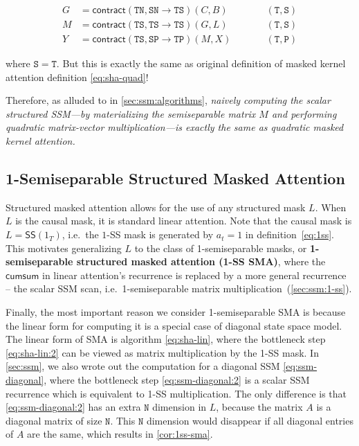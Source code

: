 \begin{equation}
  \label{eq:ssm-quad}
  \begin{aligned}
    G     & = \mathsf{contract}(\mathtt{TN, SN \to TS})(C, B) & & \qquad \mathtt{(T,S)} \\
    M     & = \mathsf{contract}(\mathtt{TS, TS \to TS})(G, L) & & \qquad \mathtt{(T,S)} \\
    Y     & = \mathsf{contract}(\mathtt{TS, SP \to TP})(M, X) & & \qquad \mathtt{(T,P)}
  \end{aligned}
\end{equation}

where $\mathtt{S}=\mathtt{T}$.
But this is exactly the same as original definition of masked kernel attention definition \eqref{eq:sha-quad}!

Therefore, as alluded to in \ref{sec:ssm:algorithms},
\emph{naively computing the scalar structured SSM---by materializing the semiseparable matrix $M$ and performing quadratic matrix-vector multiplication---is exactly the same as quadratic masked kernel attention.}

\subsection{1-Semiseparable Structured Masked Attention}
\label{sec:ssd:1ss-sma}

Structured masked attention allows for the use of any structured mask $L$. When $L$ is the causal mask, it is standard linear attention. Note that the causal mask is $L = \mathsf{SS}(1_T)$, i.e.\ the $1$-SS mask is generated by $a_t=1$ in definition~\eqref{eq:1ss}.
This motivates generalizing $L$ to the class of 1-semiseparable masks, or \textbf{1-semiseparable structured masked attention (1-SS SMA)}, where the $\mathsf{cumsum}$ in linear attention's recurrence is replaced by a more general recurrence -- the scalar SSM scan, i.e.\ 1-semiseparable matrix multiplication~(\ref{sec:ssm:1-ss}).

Finally, the most important reason we consider 1-semiseparable SMA is because the linear form for computing it is a special case of diagonal state space model. The linear form of SMA is algorithm \eqref{eq:sha-lin}, where the bottleneck step \eqref{eq:sha-lin:2} can be viewed as matrix multiplication by the 1-SS mask. In \ref{sec:ssm}, we also wrote out the computation for a diagonal SSM \eqref{eq:ssm-diagonal}, where the bottleneck step \eqref{eq:ssm-diagonal:2} is a scalar SSM recurrence which is equivalent to 1-SS multiplication. The only difference is that \eqref{eq:ssm-diagonal:2} has an extra $\mathtt{N}$ dimension in $L$, because the matrix $A$ is a diagonal matrix of size $\mathtt{N}$.
This $\mathtt{N}$ dimension would disappear if all diagonal entries of $A$ are the same, which results in \ref{cor:1ss-sma}.

